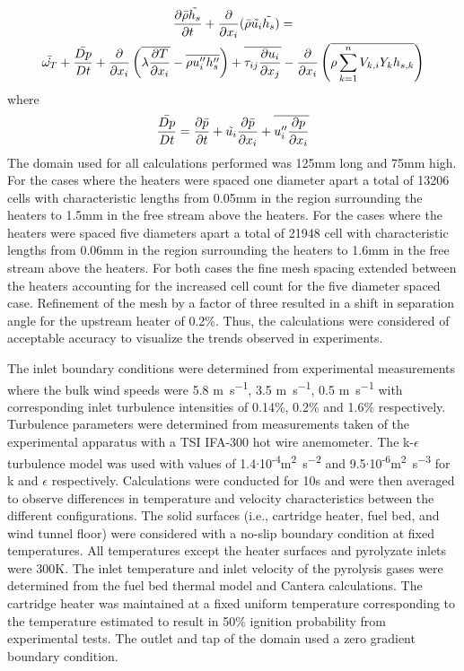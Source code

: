             \begin{multline}
                \pder[\bar{\rho}\tilde{h_s}]{t} + \pder{x_i} (\bar{\rho} \tilde{u_i} \tilde{h_s}) = \\ \bar{\dot{\omega_T}} + \frac{\bar{Dp}}{Dt} + \pder{x_i} \left( \overline{\lambda \pder[T]{x_i}} - \overline{\rho u''_i h''_s} \right) + \overline{\tau_{ij} \pder[u_i]{x_j}} - \pder{x_i} \left( \overline{\rho \sum_{k=1}^n V_{k,i} Y_k h_{s,k}} \right)
            \end{multline}
        where
            \begin{equation}
                \frac{\bar{Dp}}{Dt} = \pder[\bar{p}]{t} + \tilde{u_i} \pder[\bar{p}]{x_i}+ \overline{u''_i \pder[p]{x_i}}    
            \end{equation}
     The domain used for all calculations performed was 125\si{\milli\meter} long and 75\si{\milli\meter} high. For the cases where the heaters were spaced one diameter apart a total of 13206 cells with characteristic lengths from 0.05\si{\milli\meter} in the region surrounding the heaters to 1.5\si{\milli\meter} in the free stream above the heaters. For the cases where the heaters were spaced five diameters apart a total of 21948 cell with characteristic lengths from 0.06\si{\milli\meter} in the region surrounding the heaters to 1.6\si{\milli\meter} in the free stream above the heaters. For both cases the fine mesh spacing extended between the heaters accounting for the increased cell count for the five diameter spaced case. Refinement of the mesh by a factor of three resulted in a shift in separation angle for the upstream heater of 0.2\%. Thus, the calculations were considered of acceptable accuracy to visualize the trends observed in experiments.
    
    The inlet boundary conditions were determined from experimental measurements where the bulk wind speeds were 5.8 \si{\meter\per\second}, 3.5 \si{\meter\per\second}, 0.5 \si{\meter\per\second} with corresponding inlet turbulence intensities of 0.14\%, 0.2\% and 1.6\% respectively. Turbulence parameters were determined from measurements taken of the experimental apparatus with a TSI IFA-300 hot wire anemometer. The k-$\epsilon$ turbulence model was used with values of 1.4$\cdot$10\textsuperscript{-4}\si{\square\meter\per\square\second} and 9.5$\cdot$10\textsuperscript{-6}\si{\square\meter\per\cubic\second} for k and $\epsilon$ respectively. Calculations were conducted for 10\si{\second} and were then averaged to observe differences in temperature and velocity characteristics between the different configurations. The solid surfaces (i.e., cartridge heater, fuel bed, and wind tunnel floor) were considered with a no-slip boundary condition at fixed temperatures. All temperatures except the heater surfaces and pyrolyzate inlets were 300\si{\kelvin}. The inlet temperature and inlet velocity of the pyrolysis gases were determined from the fuel bed thermal model and Cantera calculations. The cartridge heater was maintained at a fixed uniform temperature corresponding to the temperature estimated to result in 50\% ignition probability from experimental tests. The outlet and tap of the domain used a zero gradient boundary condition. 
    
